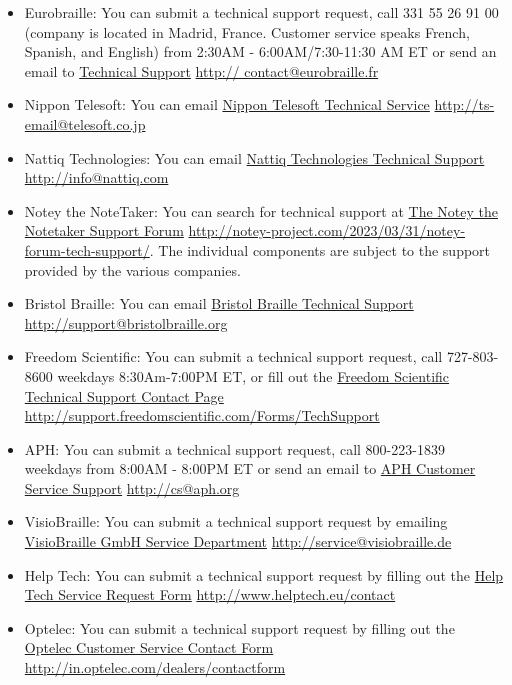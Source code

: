 \documentclass[12pt,letterpaper,twoside]{extreport}
\begin{document}
\begin{appendices}
\begin{itemize}[leftmargin=*]
\item Eurobraille: You can submit a technical support request, call 331 55 26 91 00 (company is located in Madrid, France. Customer service speaks French, Spanish, and English) from 2:30AM - 6:00AM/7:30-11:30 AM ET or send an email to \href{http:// contact@eurobraille.fr}{Technical Support}  \break\url{http:// contact@eurobraille.fr}
\item Nippon Telesoft: You can email \href{http://ts-email@telesoft.co.jp}{Nippon Telesoft Technical Service}  \break\url{http://ts-email@telesoft.co.jp}
\item Nattiq Technologies: You can email \href{http://info@nattiq.com}{Nattiq Technologies Technical Support}  \break\url{http://info@nattiq.com}
\item Notey the NoteTaker: You can search for technical support at \href{http://notey-project.com/2023/03/31/notey-forum-tech-support/}{The Notey the Notetaker Support Forum}  \break\url{http://notey-project.com/2023/03/31/notey-forum-tech-support/}. The individual components are subject to the support provided by the various companies. 
\item Bristol Braille: You can email \href{http://support@bristolbraille.org}{Bristol Braille Technical Support}  \break\url{http://support@bristolbraille.org}
\item Freedom Scientific: You can submit a technical support request, call 727-803-8600 weekdays 8:30Am-7:00PM ET, or fill out the \href{http://support.freedomscientific.com/Forms/TechSupport}{Freedom Scientific Technical Support Contact Page}  \break\url{http://support.freedomscientific.com/Forms/TechSupport}
\item APH: You can submit a technical support request, call 800-223-1839 weekdays from 8:00AM - 8:00PM ET or send an email to \href{http://cs@aph.org}{APH Customer Service Support}  \break\url{http://cs@aph.org}
\item VisioBraille: You can submit a technical support request by emailing \href{http://service@visiobraille.de}{VisioBraille GmbH Service Department}  \break\url{http://service@visiobraille.de}
\item Help Tech: You can submit a technical support request by filling out the \href{http://www.helptech.eu/contact}{Help Tech Service Request Form}  \break\url{http://www.helptech.eu/contact}
\item Optelec: You can submit a technical support request by filling out the \href{http://in.optelec.com/dealers/contactform}{Optelec Customer Service Contact Form}  \break\url{http://in.optelec.com/dealers/contactform}
\end{itemize}


\end{appendices}
\end{document}
